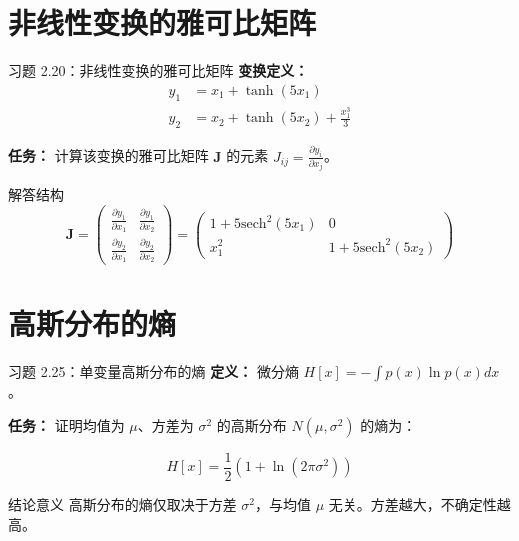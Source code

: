 \documentclass[12pt, aspectratio=169]{beamer}
\begin{document}
\section{非线性变换的雅可比矩阵}
\begin{frame}{习题 2.20：非线性变换的雅可比矩阵}
    \textbf{变换定义：}
    \begin{align}
        y_1 &= x_1 +\tanh(5x_1) \\
        y_2 &= x_2 +\tanh(5x_2) +\frac{x_1^3}{3}
    \end{align}
    
    \textbf{任务：}
    计算该变换的雅可比矩阵 $\mathbf{J}$ 的元素 $J_{ij} = \frac{\partial y_i}{\partial x_j}$。
    
    \begin{block}{解答结构}
        \[
        \mathbf{J} = \begin{pmatrix} 
        \frac{\partial y_1}{\partial x_1} & \frac{\partial y_1}{\partial x_2} \\
        \frac{\partial y_2}{\partial x_1} & \frac{\partial y_2}{\partial x_2}
        \end{pmatrix} = \begin{pmatrix} 
        1 + 5\text{sech}^2(5x_1) & 0 \\
        x_1^2 & 1 + 5\text{sech}^2(5x_2)
        \end{pmatrix}
        \]
    \end{block}
\end{frame}

\section{高斯分布的熵}
\begin{frame}{习题 2.25：单变量高斯分布的熵}
    \textbf{定义：}
    微分熵 $H[x] = -\int p(x) \ln p(x) dx$。
    
    \textbf{任务：}
    证明均值为 $\mu$、方差为 $\sigma^2$ 的高斯分布 $N(\mu,\sigma^2)$ 的熵为：
    
    \begin{equation}
        H[x]=\frac{1}{2}\left(1+\ln (2\pi\sigma^2)\right)
    \end{equation}
    
    \begin{alertblock}{结论意义}
        高斯分布的熵仅取决于方差 $\sigma^2$，与均值 $\mu$ 无关。方差越大，不确定性越高。
    \end{alertblock}
\end{frame}
\end{document}
